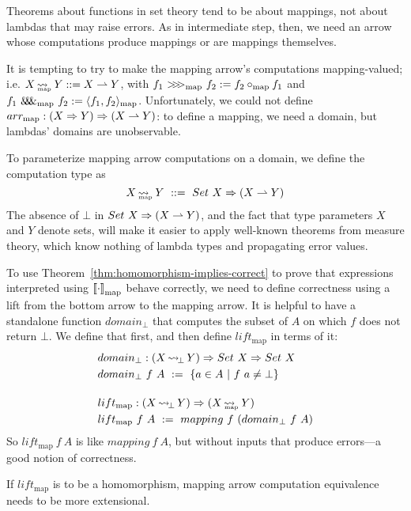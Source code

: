 \documentclass{llncs}
\newcommand{\arrow}{\rightsquigarrow}
\newcommand{\pto}{\rightharpoonup}
\newcommand{\arrowlift}{\ensuremath{lift}}
\newcommand{\arrowarr}{\ensuremath{arr}}
\newcommand{\arrowcomp}{\ensuremath{{>}\mspace{-6mu}{>}\mspace{-6mu}{>}}}
\newcommand{\arrowpair}{\ensuremath{\mathit{\&\mspace{-7.5mu}\&\mspace{-7.5mu}\&}}}
\DeclareMathOperator{\botto}{\arrow_{\mspace{-3mu}\bot}}
\newcommand{\map}{_\mathrm{map}}
\DeclareMathOperator{\mapto}{\arrow_{\mspace{-21mu}\map}}
\newcommand{\liftmap}{\arrowlift\map}
\newcommand{\arrmap}{\arrowarr\map}
\newcommand{\compmap}{\arrowcomp\map}
\newcommand{\pairmap}{\arrowpair\map}
\begin{document}
Theorems about functions in set theory tend to be about mappings, not about lambdas that may raise errors.
As in intermediate step, then, we need an arrow whose computations produce mappings or are mappings themselves.

It is tempting to try to make the mapping arrow's computations mapping-valued; i.e. $X \mapto Y ::= X \pto Y$, with $f_1~\compmap~f_2 := f_2 \circ\map f_1$ and $f_1~\pairmap~f_2 := \pair{f_1,f_2}\map$.
Unfortunately, we could not define $\arrmap : (X \tto Y) \tto (X \pto Y)$: to define a mapping, we need a domain, but lambdas' domains are unobservable.

To parameterize mapping arrow computations on a domain, we define the  computation type as
\begin{equation}
	X \mapto Y \ ::= \ Set~X \tto (X \pto Y)
\end{equation}
The absence of $\bot$ in $Set~X \tto (X \pto Y)$, and the fact that type parameters $X$ and $Y$ denote sets, will make it easier to apply well-known theorems from measure theory, which know nothing of lambda types and propagating error values.

To use Theorem~\ref{thm:homomorphism-implies-correct} to prove that expressions interpreted using $\meaningof{\cdot}\map$ behave correctly, we need to define correctness using a lift from the bottom arrow to the mapping arrow.
It is helpful to have a standalone function $domain_\bot$ that computes the subset of $A$ on which $f$ does not return $\bot$.
We define that first, and then define $\liftmap$ in terms of it:
\begin{align}
	&\begin{aligned}
		&domain_\bot : (X \botto Y) \tto Set~X \tto Set~X \\
		&domain_\bot~f~A \ := \ \setb{a \in A}{f~a \neq \bot}
	\end{aligned} \\
\nonumber \\[-6pt]
	&\begin{aligned}
		&\liftmap : (X \botto Y) \tto (X \mapto Y) \\
		&\liftmap~f~A \ := \ mapping~f~(domain_\bot~f~A)
	\end{aligned}
\end{align}
So $\liftmap~f~A$ is like $mapping~f~A$, but without inputs that produce errors---a good notion of correctness.

If $\liftmap$ is to be a homomorphism, mapping arrow computation equivalence needs to be more extensional.
\end{document}
